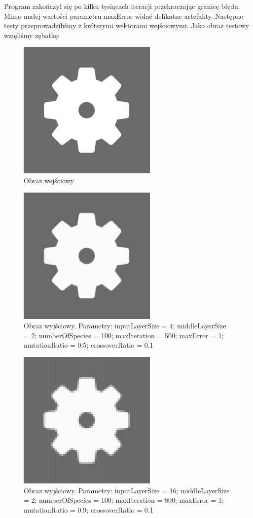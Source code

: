 \documentclass[12pt,a4paper,oneside]{article}
\begin{document}
Program zakończył się po kilku tysiącach iteracji przekraczając granicę błędu. Mimo małej wartości parametru maxError widać delikatne artefakty. Następne testy przeprowadziliśmy z krótszymi wektorami wejściowymi. Jako obraz testowy wzięliśmy zębatkę:

\begin{figure}[H]
\centering
\includegraphics[width=.4\textwidth]{cog}
\caption{Obraz wejściowy}
\end{figure}

\begin{figure}[H]
\centering
\includegraphics[width=.4\textwidth]{cog4}
\caption{Obraz wyjściowy. Parametry: inputLayerSize = 4; middleLayerSize = 2; numberOfSpecies = 100; maxIteration = 500; maxError = 1; mutationRatio = 0.5; crossoverRatio = 0.1}
\end{figure}

\begin{figure}[H]
\centering
\includegraphics[width=.4\textwidth]{cog16}
\caption{Obraz wyjściowy. Parametry: inputLayerSize = 16; middleLayerSize = 2; numberOfSpecies = 100; maxIteration = 800; maxError = 1; mutationRatio = 0.9; crossoverRatio = 0.1}
\end{figure}
\end{document}
